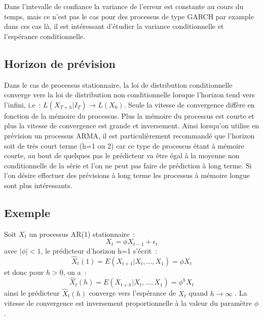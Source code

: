 \documentclass[11pt]{scrartcl} %
\begin{document}
Dans l'intevalle de confiance la variance de l'erreur est constante au cours du temps, mais ce n'est pas le cas pour des processus de type GARCH par example dans ces cas là, il est intéressant d'étudier la variance conditionnelle et l'espérance conditionnelle.
\subsection{Horizon de prévision}
Dans le cas de processus stationnaire, la loi de distribution conditionnelle converge vers la loi de distribution non conditionnelle lorsque l'horizon tend vers l'infini, i.e~: $L(X_{T+h}|I_T)\rightarrow L(X_0)$. Seule la vitesse de convergence diffère en fonction de la mémoire du processus. Plus la mémoire du processus est courte et plus la vitesse de convergence est grande et inversement.
Ainsi lorsqu'on utilise en prévision un processus ARMA, il est particulièrement recommandé que l'horizon soit de très court terme (h=1 ou 2) car ce type de processus étant à mémoire courte, au bout de quelques pas le prédicteur va être égal à la moyenne non conditionnelle de la série et l'on ne peut pas faire de prédiction à long terme. Si l'on désire effectuer des prévisions à long terme les processus à mémoire longue sont plus intéressants. 

\subsection*{Exemple}
Soit $X_t$ un processus AR(1) stationnaire~:
$$
X_t = \phi X_{t-1}+\epsilon_t
$$
avec $|\phi|<1$, le prédicteur d'horizon h=1 s'écrit~:
$$
\hat{X}_t(1)=E(X_{t+1}|X_t,...,X_1)=\phi X_t
$$
et donc pour $h>0$, on a~:
$$
\hat{X}_t(h)=E(X_{t+h}|X_t,...,X_1)=\phi^hX_t
$$
ainsi le prédicteur $\hat{X}_t(h)$ converge vers l'espérance de $X_t$ quand $h\rightarrow \infty$ . La vitesse de convergence est inversement proportionnelle à la valeur du paramètre $\phi$. 
\end{document}
